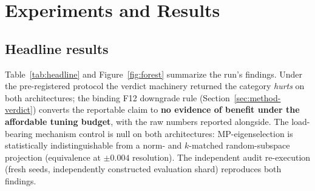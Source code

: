 \section{Experiments and Results}
\label{sec:experiments}

\subsection{Headline results}
\label{sec:headline}

Table~\ref{tab:headline} and Figure~\ref{fig:forest} summarize the run's
findings. Under the pre-registered protocol the verdict machinery returned
the category \emph{hurts} on both architectures; the binding F12 downgrade
rule (Section~\ref{sec:method-verdict}) converts the reportable claim to
\textbf{no evidence of benefit under the affordable tuning budget}, with the
raw numbers reported alongside. The load-bearing mechanism control is null
on both architectures: MP-eigenselection is statistically indistinguishable
from a norm- and $k$-matched random-subspace projection (equivalence at
$\pm 0.004$ resolution). The independent audit re-execution (fresh seeds,
independently constructed evaluation shard) reproduces both findings.

